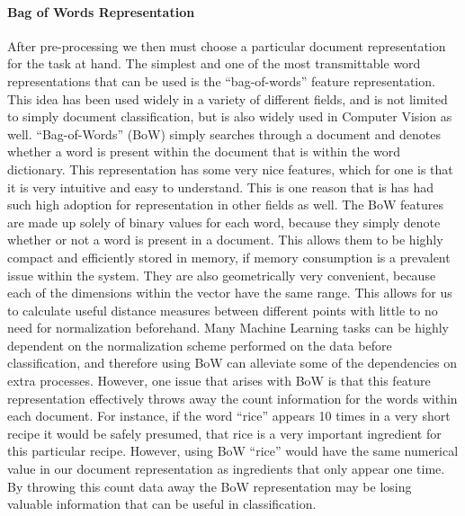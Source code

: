 \documentclass[paper=a4, fontsize=11pt]{scrartcl} %
\numberwithin{equation}{section} %
\numberwithin{figure}{section} %
\numberwithin{table}{section} %
\begin{document}
\paragraph{Bag of Words Representation}
After pre-processing we then must choose a particular document representation for the task at hand.  
The simplest and one of the most transmittable word representations that can be used is the ``bag-of-words'' feature representation.  
This idea has been used widely in a variety of different fields, and is not limited to simply document classification, but is also widely used in Computer Vision as well.  
``Bag-of-Words'' (BoW) simply searches through a document and denotes whether a word is present within the document that is within the word dictionary.  
This representation has some very nice features, which for one is that it is very intuitive and easy to understand.  
This is one reason that is has had such high adoption for representation in other fields as well.  The BoW features are made up solely of binary values for each word, because they simply denote whether or not a word is present in a document.  
This allows them to be highly compact and efficiently stored in memory, if memory consumption is a prevalent issue within the system.  
They are also geometrically very convenient, because each of the dimensions within the vector have the same range.  
This allows for us to calculate useful distance measures between different points with little to no need for normalization beforehand.  
Many Machine Learning tasks can be highly dependent on the normalization scheme performed on the data before classification, and therefore using BoW can alleviate some of the dependencies on extra processes.  
However, one issue that arises with BoW is that this feature representation effectively throws away the count information for the words within each document.  
For instance, if the word ``rice'' appears 10 times in a very short recipe it would be safely presumed, that rice is a very important ingredient for this particular recipe.  
However, using BoW ``rice'' would have the same numerical value in our document representation as ingredients that only appear one time.  
By throwing this count data away the BoW representation may be losing valuable information that can be useful in classification.
\end{document}
